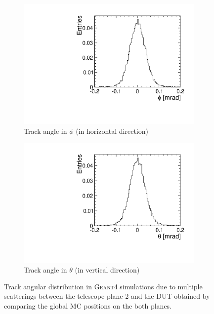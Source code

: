 \begin{figure}[htbp] \centering
  \begin{subfigure}[b]{0.45\textwidth}
    \includegraphics[width=\textwidth]{./figures/Telescope/MC_trackAnglePhi_planes_302_50.pdf}
    \caption{Track angle in $\phi$ (in horizontal direction)}
  \end{subfigure}\hfill
  \begin{subfigure}[b]{0.45\textwidth}
    \includegraphics[width=\textwidth]{./figures/Telescope/MC_trackAngleTheta_planes_302_50.pdf}
    \caption{Track angle in $\theta$ (in vertical direction)}
  \end{subfigure}
  \caption{Track angular distribution in \textsc{Geant4} simulations
    due to multiple scatterings between the telescope plane 2 and the
    DUT obtained by comparing the global MC positions on the both
    planes.}
  \label{fig:MCbeamAngleDistr}
\end{figure}

